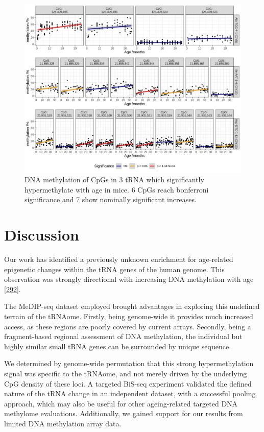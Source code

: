 \documentclass[
]{book}
\begin{document}
\begin{figure}

{\centering \includegraphics[width=1\linewidth]{./figs/CpGPlotComb} 

}

\caption{DNA methylation of CpGs in 3 tRNA which significantly hypermethylate with age in mice. 6 CpGs reach bonferroni significance and 7 show nominally significant increases.}\label{fig:mouse}
\end{figure}



\newpage

\hypertarget{discussion-1}{%
\section{Discussion}\label{discussion-1}}

Our work has identified a previously unknown enrichment for age-related epigenetic changes within the tRNA genes of the human genome.
This observation was strongly directional with increasing DNA methylation with age {[}\protect\hyperlink{ref-Ehrlich2019}{292}{]}.

The MeDIP-seq dataset employed brought advantages in exploring this undefined terrain of the tRNAome.
Firstly, being genome-wide it provides much increased access, as these regions are poorly covered by current arrays.
Secondly, being a fragment-based regional assessment of DNA methylation, the individual but highly similar small tRNA genes can be surrounded by unique sequence.

We determined by genome-wide permutation that this strong hypermethylation signal was specific to the tRNAome, and not merely driven by the underlying CpG density of these loci.
A targeted BiS-seq experiment validated the defined nature of the tRNA change in an independent dataset, with a successful pooling approach, which may also be useful for other ageing-related targeted DNA methylome evaluations.
Additionally, we gained support for our results from limited DNA methylation array data.
\end{document}
